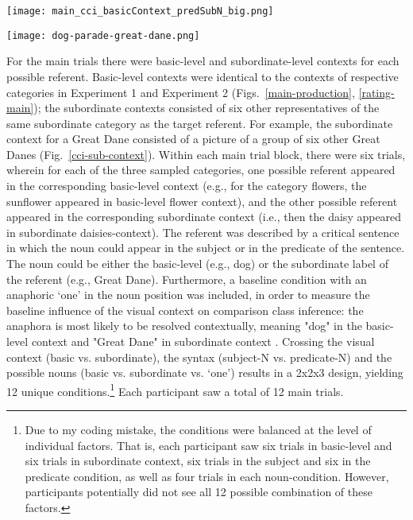 \begin{figure*}[t]
	\begin{center}
		\texttt{[image: main\_cci\_basicContext\_predSubN\_big.png]}
	\end{center}
	\caption{Example view of a comparison class inference main trial: Participants paraphrased the critical utterance with a subordinate noun in predicate position, which appeared in basic-level context, describing a large-subordinate target.}
	\label{main-cci}
\end{figure*}
\begin{figure*}[h]
	\begin{center}
		\texttt{[image: dog-parade-great-dane.png]}
	\end{center}
	\caption{Example view of a subordinate context: For the category Great Danes, the contextt depicts six different Great Danes.}
	\label{cci-sub-context}
\end{figure*}
For the main trials there were basic-level and subordinate-level contexts for each possible referent. Basic-level contexts were identical to the contexts of respective categories in Experiment 1 and Experiment 2 (Figs.~\ref{main-production}, \ref{rating-main}); the subordinate contexts consisted of six other representatives of the same subordinate category as the target referent. For example, the subordinate context for a Great Dane consisted of a picture of a group of six other Great Danes (Fig.~\ref{cci-sub-context}). Within each main trial block, there were six trials, wherein for each of the three sampled categories, one possible referent appeared in the corresponding basic-level context (e.g., for the category flowers, the sunflower appeared in basic-level flower context), and the other possible referent appeared in the corresponding subordinate context (i.e., then the daisy appeared in subordinate daisies-context). 
The referent was described by a critical sentence in which the noun could appear in the subject or in the predicate of the sentence. The noun could be either the basic-level (e.g., dog) or the subordinate label of the referent (e.g., Great Dane). Furthermore, a baseline condition with an anaphoric ‘one’ in the noun position was included, in order to measure the baseline influence of the visual context on comparison class inference: the anaphora is most likely to be resolved contextually, meaning "dog" in the basic-level context and "Great Dane" in subordinate context \parencite{goldberg2017one}. Crossing the visual context (basic vs. subordinate), the syntax (subject-N vs. predicate-N) and the possible nouns (basic vs. subordinate vs. ‘one’) results in a 2x2x3 design, yielding 12 unique conditions.\footnote{Due to my coding mistake, the conditions were balanced at the level of individual factors. That is, each participant saw six trials in basic-level and six trials in subordinate context, six trials in the subject and six in the predicate condition, as well as four trials in each noun-condition. However, participants potentially did not see all 12 possible combination of these factors.}
Each participant saw a total of 12 main trials.   


